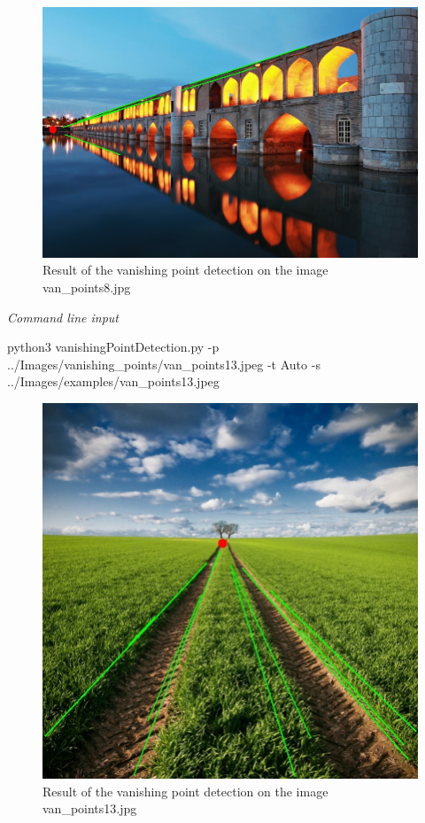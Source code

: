 \begin{multicols}{2}
\begin{figure}[H]
    \centering
    \includegraphics[width=0.98\columnwidth]{../Images/examples/van_points8.jpg}
    \caption{Result of the vanishing point detection on the image van\_points8.jpg}
    \label{fig-7}
\end{figure}

\noindent
\textit{Command line input}

\begin{bashscript}
    python3 vanishingPointDetection.py -p ../Images/vanishing_points/van_points13.jpeg -t Auto -s ../Images/examples/van_points13.jpeg
\end{bashscript}

\begin{figure}[H]
    \centering
    \includegraphics[width=0.98\columnwidth]{../Images/examples/van_points13.jpg}
    \caption{Result of the vanishing point detection on the image van\_points13.jpg}
    \label{fig-8}
\end{figure}


\end{multicols}
